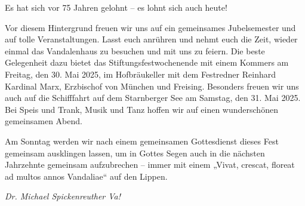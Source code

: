\begin{multicols}{2}
Es hat sich vor 75 Jahren gelohnt – es lohnt sich auch
heute!

Vor diesem Hintergrund freuen wir uns auf ein gemeinsames
Jubelsemester und auf tolle Veranstaltungen. Lasst euch anrühren und nehmt euch
die Zeit, wieder einmal das Vandalenhaus zu besuchen und mit uns zu feiern. Die
beste Gelegenheit dazu bietet das Stiftungsfestwochenende mit einem Kommers am
Freitag, den 30. Mai 2025, im Hofbräukeller mit dem Festredner Reinhard
Kardinal Marx, Erzbischof von München und Freising. Besonders freuen wir uns
auch auf die Schifffahrt auf dem Starnberger See am Samstag, den 31. Mai 2025.
Bei Speis und Trank, Musik und Tanz hoffen wir auf einen wunderschönen
gemeinsamen Abend.

\end{multicols}
Am Sonntag werden wir nach einem gemeinsamen Gottesdienst
dieses Fest gemeinsam ausklingen lassen, um in Gottes Segen auch in die
nächsten Jahrzehnte gemeinsam aufzubrechen – immer mit einem „Vivat, crescat,
floreat ad multos annos Vandaliae“ auf den Lippen.

\begin{flushright}
		\hfill\emph{Dr. Michael Spickenreuther Va!}
	\end{flushright}